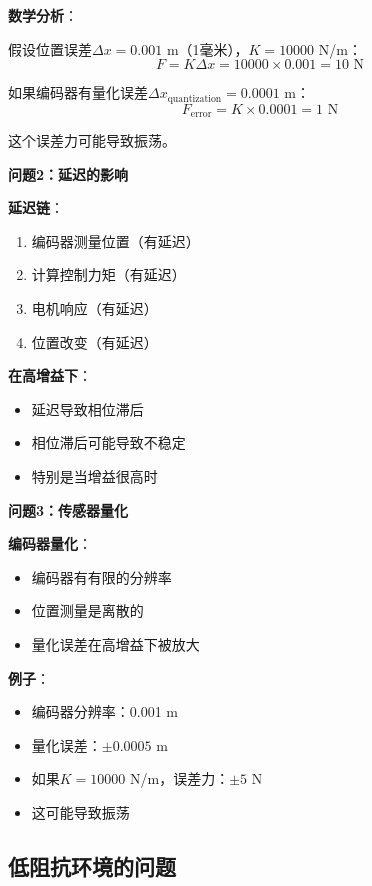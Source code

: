 \documentclass[12pt,a4paper]{article}
\begin{document}
\textbf{数学分析}：

假设位置误差$\Delta x = 0.001$ m（1毫米），$K = 10000$ N/m：
\begin{equation}
F = K\Delta x = 10000 \times 0.001 = 10 \text{ N}
\end{equation}

如果编码器有量化误差$\Delta x_{\text{quantization}} = 0.0001$ m：
\begin{equation}
F_{\text{error}} = K \times 0.0001 = 1 \text{ N}
\end{equation}

这个误差力可能导致振荡。

\textbf{问题2：延迟的影响}

\textbf{延迟链}：
\begin{enumerate}
\item 编码器测量位置（有延迟）
\item 计算控制力矩（有延迟）
\item 电机响应（有延迟）
\item 位置改变（有延迟）
\end{enumerate}

\textbf{在高增益下}：
\begin{itemize}
\item 延迟导致相位滞后
\item 相位滞后可能导致不稳定
\item 特别是当增益很高时
\end{itemize}

\textbf{问题3：传感器量化}

\textbf{编码器量化}：
\begin{itemize}
\item 编码器有有限的分辨率
\item 位置测量是离散的
\item 量化误差在高增益下被放大
\end{itemize}

\textbf{例子}：
\begin{itemize}
\item 编码器分辨率：0.001 m
\item 量化误差：$\pm 0.0005$ m
\item 如果$K = 10000$ N/m，误差力：$\pm 5$ N
\item 这可能导致振荡
\end{itemize}

\subsection{低阻抗环境的问题}
\end{document}
